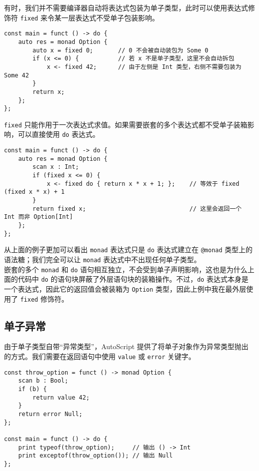 有时，我们并不需要编译器自动将表达式包装为单子类型，此时可以使用表达式修饰符 \lstinline!fixed! 来令某一层表达式不受单子包装影响。

\begin{minipage}[c]{0.95\textwidth}
\vspace{1.0em}
\begin{lstlisting}
const main = funct () -> do {
	auto res = monad Option {
		auto x = fixed 0;		// 0 不会被自动装包为 Some 0
		if (x <= 0) {			// 若 x 不是单子类型，这里不会自动拆包
			x <- fixed 42;		// 由于左侧是 Int 类型，右侧不需要包装为 Some 42
		}
		return x;
	};
};
\end{lstlisting}
\end{minipage}

\lstinline!fixed! 只能作用于一次表达式求值。如果需要嵌套的多个表达式都不受单子装箱影响，可以直接使用 \lstinline!do! 表达式。

\begin{lstlisting}
const main = funct () -> do {
	auto res = monad Option {
		scan x : Int;
		if (fixed x <= 0) {
			x <- fixed do { return x * x + 1; };	// 等效于 fixed (fixed x * x) + 1
		}
		return fixed x;								// 这里会返回一个 Int 而非 Option[Int]
	};
};
\end{lstlisting}

从上面的例子更加可以看出 \lstinline!monad! 表达式只是 \lstinline!do! 表达式建立在 \lstinline!@monad! 类型上的语法糖；我们完全可以让 \lstinline!monad! 表达式中不出现任何单子类型。 \\

嵌套的多个 \lstinline!monad! 和 \lstinline!do! 语句相互独立，不会受到单子声明影响，这也是为什么上面的代码中 \lstinline!do! 的语句块屏蔽了外层语句块的装箱操作。不过，\lstinline!do! 表达式本身是一个表达式，因此它的返回值会被装箱为 \lstinline!Option! 类型，因此上例中我在最外层使用了 \lstinline!fixed! 修饰符。


\subsection{单子异常}

由于单子类型自带“异常类型”，AutoScript 提供了将单子对象作为异常类型抛出的方式。我们需要在返回语句中使用 \lstinline!value! 或 \lstinline!error! 关键字。

\begin{minipage}[c]{0.95\textwidth}
\vspace{1.0em}
\begin{lstlisting}
const throw_option = funct () -> monad Option {
    scan b : Bool;
    if (b) {
        return value 42;
    }
    return error Null;
};

const main = funct () -> do {
    print typeof(throw_option);		// 输出 () -> Int
    print exceptof(throw_option());	// 输出 Null
};
\end{lstlisting}
\end{minipage}

